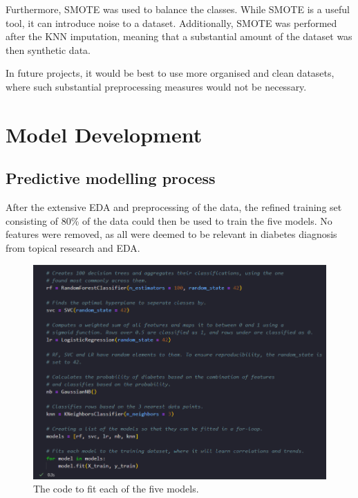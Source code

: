 \documentclass[12pt]{report}
\newcommand{\para}{\vspace{8pt}\noindent}
\begin{document}
\para Furthermore, SMOTE was used to balance the classes. While SMOTE is a useful tool, it can introduce noise to a dataset.
Additionally, SMOTE was performed after the KNN imputation, meaning that a substantial amount of the dataset was then synthetic data.

\para In future projects, it would be best to use more organised and clean datasets, where such substantial 
preprocessing measures would not be necessary.

\chapter{Model Development} %

\section{Predictive modelling process}
After the extensive EDA and preprocessing of the data, the refined training set consisting of 80\% of the data 
could then be used to train the five models. No features were removed, as all were deemed to be relevant in
diabetes diagnosis from topical research and EDA. 


\begin{figure}[H]
    \centering 
    \includegraphics[width=\linewidth]{ModelDev/Iteration1/Code/Fitting.png}
    \caption{The code to fit each of the five models.}
    \label{fig:ModelFitting}
\end{figure}
\end{document}
